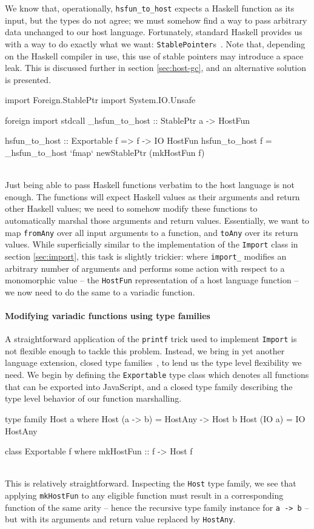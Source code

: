 \documentclass{sigplanconf}
\begin{document}
We know that, operationally, \lstinline!hsfun_to_host! expects a Haskell
function as its input, but the types do not agree; we must somehow find a way
to pass arbitrary data unchanged to our host language.
Fortunately, standard Haskell provides us with a way to do exactly what we want:
\lstinline!StablePointer!s\ \cite{stableptr}. Note that, depending on the
Haskell compiler in use, this use of stable pointers may introduce a space
leak. This is discussed further in section \ref{sec:host-gc}, and an
alternative solution is presented.\\
\begin{code}
import Foreign.StablePtr
import System.IO.Unsafe

foreign import stdcall
  _hsfun_to_host :: StablePtr a -> HostFun

hsfun_to_host :: Exportable f => f -> IO HostFun
hsfun_to_host f =
  _hsfun_to_host `fmap` newStablePtr (mkHostFun f)
\end{code}\\
Just being able to pass Haskell functions verbatim to the host language is not
enough. The functions will expect Haskell values as their arguments and return
other Haskell values; we need to somehow modify these functions to
automatically marshal those arguments and return values.
Essentially, we want to map
\lstinline!fromAny! over all input arguments to a function, and
\lstinline!toAny! over its return values.
While superficially similar to the implementation of the \lstinline!Import!
class in section \ref{sec:import}, this task is slightly trickier:
where \lstinline!import_! modifies an arbitrary number of arguments and
performs some action with respect to a monomorphic value -- the
\lstinline!HostFun! representation of a host language function -- we now need
to do the same to a variadic function.

\paragraph{Modifying variadic functions using type families}
A straightforward application of the \lstinline!printf! trick used to
implement \lstinline!Import! is not flexible
enough to tackle this problem. Instead, we bring in yet another language
extension, closed type families\ \cite{closedtypefamilies}, to lend us the type
level flexibility we need. We begin by defining the \lstinline!Exportable!
type class which denotes all functions that can be exported into JavaScript,
and a closed type family describing the type level behavior of our function
marshalling.\\
\begin{code}
type family Host a where
  Host (a -> b) = HostAny -> Host b
  Host (IO a)   = IO HostAny

class Exportable f where
  mkHostFun :: f -> Host f
\end{code}\\
This is relatively straightforward. Inspecting the \lstinline!Host! type
family, we see that applying \lstinline!mkHostFun! to any eligible function
must result in a corresponding function of the same arity -- hence the
recursive type family instance for \lstinline!a -> b! -- but with its
arguments and return value replaced by \lstinline!HostAny!.
\end{document}
